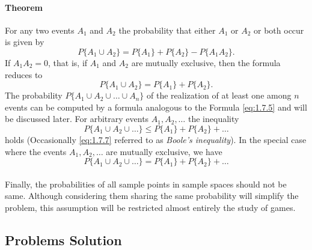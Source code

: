 \documentclass{article}
\numberwithin{equation}{subsection}
\begin{document}
			\paragraph{Theorem} For any two events $A_1$ and $A_2$ the probability that either $A_1$ or $A_2$ or both occur is given by 
			\begin{equation}
				\label{eq:1.7.5}
				P\{A_1\cup A_2\} = P\{A_1\}+P\{A_2\}-P\{A_1A_2\}. 
			\end{equation}
			If $A_1A_2 = 0$, that is, if $A_1$ and $A_2$ are mutually exclusive, then the formula reduces to 			
			\begin{equation}
				\label{eq:1.7.6}
				P\{A_1\cup A_2\} = P\{A_1\}+P\{A_2\}.
			\end{equation}			
			The probability $P\{A_1\cup A_2\cup \dots \cup A_n\}$ of the realization of at least one among $n$ events can be computed by a formula analogous to the Formula \ref{eq:1.7.5} and will be discussed later. For arbitrary events $A_1,A_2,\dots$ the inequality
			\begin{equation}
				\label{eq:1.7.7}
				P\{A_1\cup A_2\cup \dots\} \leq P\{A_1\} + P\{A_2\} + \dots
			\end{equation}
			holds (Occasionally \ref{eq:1.7.7} referred to as \textit{Boole's inequality}). In the special case where the events $A_1,A_2,\dots$ are mutually exclusive, we have 
			\begin{equation}
				\label{eq:1.7.8}
				P\{A_1\cup A_2\cup \dots\} = P\{A_1\} + P\{A_2\} + \dots
			\end{equation}
			\paragraph{} Finally, the probabilities of all sample points in sample spaces should not be same. Although considering them sharing the same probability will simplify the problem, this assumption will be restricted almost entirely the study of games.
		\subsection{Problems Solution}
\end{document}
